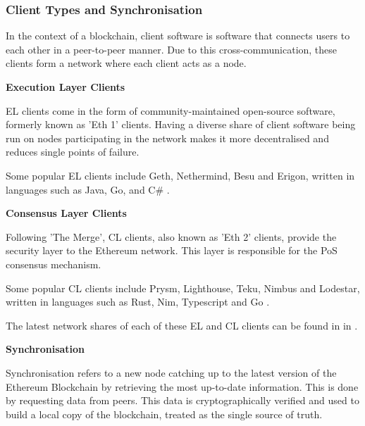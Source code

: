 

\subsubsection{Client Types and Synchronisation}

In the context of a blockchain, client software is software that connects users to each other in a peer-to-peer manner. Due to this cross-communication, these clients form a network where each client acts as a node. 

\textbf{Execution Layer Clients}

EL clients come in the form of community-maintained open-source software, formerly known as 'Eth 1' clients. Having a diverse share of client software being run on nodes participating in the network makes it more decentralised and reduces single points of failure.

Some popular EL clients include Geth, Nethermind, Besu and Erigon, written in languages such as Java, Go, and C\# \cite{EthereumEthereum.org}. 

\textbf{Consensus Layer Clients }

Following 'The Merge', CL clients, also known as 'Eth 2' clients, provide the security layer to the Ethereum network. This layer is responsible for the PoS consensus mechanism.

Some popular CL clients include Prysm, Lighthouse, Teku, Nimbus and Lodestar, written in languages such as Rust, Nim, Typescript and Go \cite{EthereumEthereum.org}. 

The latest network shares of each of these EL and CL clients can be found in  in .

\textbf{Synchronisation} 

Synchronisation refers to a new node catching up to the latest version of the Ethereum Blockchain by retrieving the most up-to-date information. This is done by requesting data from peers. This data is cryptographically verified and used to build a local copy of the blockchain, treated as the single source of truth.

